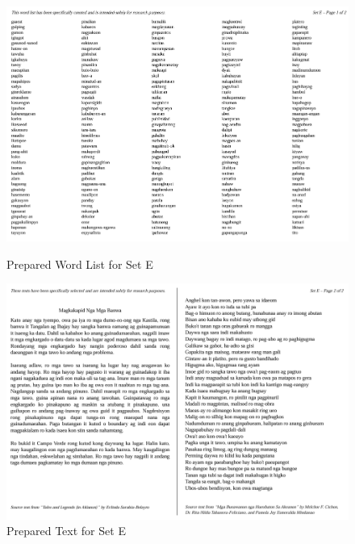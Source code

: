 \begin{figure}[h!]
	\centering
	\includegraphics[width=\textwidth]{./appendix/setE1.png}
	\caption{Prepared Word List for Set E}
	\includegraphics[width=\textwidth]{./appendix/setE2.png}
	\caption{Prepared Text for Set E}
	\label{fig:setE}
\end{figure}

